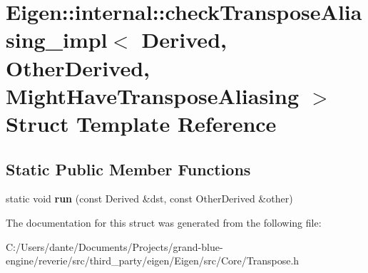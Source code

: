 \hypertarget{struct_eigen_1_1internal_1_1check_transpose_aliasing__impl}{}\section{Eigen\+::internal\+::check\+Transpose\+Aliasing\+\_\+impl$<$ Derived, Other\+Derived, Might\+Have\+Transpose\+Aliasing $>$ Struct Template Reference}
\label{struct_eigen_1_1internal_1_1check_transpose_aliasing__impl}
\subsection*{Static Public Member Functions}
\begin{DoxyCompactItemize}
\item 
\mbox{\label{struct_eigen_1_1internal_1_1check_transpose_aliasing__impl_a01cee326e5f97de5675845081f35a9ab}} 
static void {\bfseries run} (const Derived \&dst, const Other\+Derived \&other)
\end{DoxyCompactItemize}


The documentation for this struct was generated from the following file\+:\begin{DoxyCompactItemize}
\item 
C\+:/\+Users/dante/\+Documents/\+Projects/grand-\/blue-\/engine/reverie/src/third\+\_\+party/eigen/\+Eigen/src/\+Core/Transpose.\+h\end{DoxyCompactItemize}
